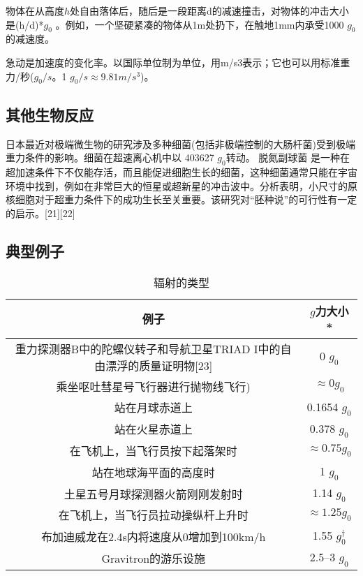 物体在从高度$h$处自由落体后，随后是一段距离d的减速撞击，对物体的冲击大小是(h/d)*$g_0$ 。例如，一个坚硬紧凑的物体从1m处扔下，在触地1mm内承受1000 $g_0$ 的减速度。

急动是加速度的变化率。以国际单位制为单位，用m/s3表示；它也可以用标准重力/秒($g_0/s$。1 $g_0/s \approx 9.81 m/s^3$)。

\subsection{其他生物反应}
日本最近对极端微生物的研究涉及多种细菌(包括非极端控制的大肠杆菌)受到极端重力条件的影响。细菌在超速离心机中以 403627 $g_0$转动。 脱氮副球菌 是一种在超加速条件下不仅能存活，而且能促进细胞生长的细菌，这种细菌通常只能在宇宙环境中找到，例如在非常巨大的恒星或超新星的冲击波中。分析表明，小尺寸的原核细胞对于超重力条件下的成功生长至关重要。该研究对“胚种说”的可行性有一定的启示。[21][22]

\subsection{典型例子}
\begin{table}[ht]
\centering
\caption{辐射的类型}\label{GLI}
\begin{tabular}{|c|c}
\hline
\textbf{例子} & \textbf{$g$力大小*}\\
\hline
重力探测器B中的陀螺仪转子和导航卫星TRIAD I中的自由漂浮的质量证明物[23] & 0 $g_0$\\
\hline
乘坐呕吐彗星号飞行器进行抛物线飞行) & $\approx 0 g_0$ \\
\hline
站在月球赤道上 & 0.1654 $g_0$ \\
\hline
站在火星赤道上 & 0.378 $g_0$ \\
\hline
在飞机上，当飞行员按下起落架时 & $\approx 0.75 g_0$ \\
\hline
站在地球海平面的高度时 & 1 $g_0$ \\
\hline
土星五号月球探测器火箭刚刚发射时 & 1.14 $g_0$ \\
\hline
在飞机上，当飞行员拉动操纵杆上升时 & $\approx 1.25 g_0$ \\
\hline
布加迪威龙在2.4s内将速度从0增加到100km/h & 1.55  $g_0^{\dagger}$ \\
\hline
Gravitron的游乐设施 & 2.5–3 $g_0$ \\
\hline

\hline

\hline

\hline

\hline

\hline
\end{tabular}
\end{table}